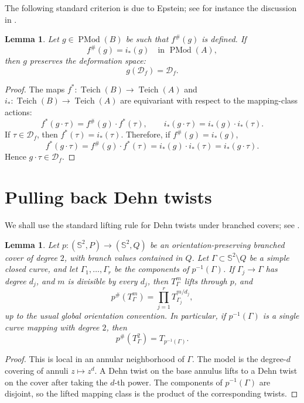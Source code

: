 \documentclass[11pt]{article}
\newtheorem{lemma}[theorem]{Lemma}
\newcommand{\Sph}{\mathbb S^2}
\newcommand{\Teich}{\operatorname{Teich}}
\newcommand{\D}{\mathcal D}
\newcommand{\PMod}{\operatorname{PMod}}
\begin{document}
The following standard criterion is due to Epstein; see for instance the discussion in \cite{discDef, defspaces}.

\begin{lemma}\label{lem:preserve}
Let $g\in \PMod(B)$ be such that $f^{\#}(g)$ is defined.  If
\[
  f^{\#}(g)=i_*(g)\quad\text{in }\PMod(A),
\]
then $g$ preserves the deformation space:
\[
  g(\D_f)=\D_f.
\]
\end{lemma}

\begin{proof}
The maps $f^*:\Teich(B)\to\Teich(A)$ and $i_*:\Teich(B)\to\Teich(A)$ are equivariant with respect to the mapping-class actions:
\[
  f^*(g\cdot \tau)=f^{\#}(g)\cdot f^*(\tau),
  \qquad
  i_*(g\cdot \tau)=i_*(g)\cdot i_*(\tau).
\]
If $\tau\in\D_f$, then $f^*(\tau)=i_*(\tau)$.  Therefore, if $f^{\#}(g)=i_*(g)$,
\[
  f^*(g\cdot\tau)
  =f^{\#}(g)\cdot f^*(\tau)
  =i_*(g)\cdot i_*(\tau)
  =i_*(g\cdot\tau).
\]
Hence $g\cdot\tau\in\D_f$.
\end{proof}

\section{Pulling back Dehn twists}

We shall use the standard lifting rule for Dehn twists under branched covers; see \cite{defspaces}.

\begin{lemma}\label{lem:twistlift}
Let $p:(\Sph,P)\to(\Sph,Q)$ be an orientation-preserving branched cover of degree $2$, with branch values contained in $Q$.  Let $\Gamma\subset\Sph\setminus Q$ be a simple closed curve, and let $\Gamma_1,\dots,\Gamma_r$ be the components of $p^{-1}(\Gamma)$.  If $\Gamma_j\to\Gamma$ has degree $d_j$, and $m$ is divisible by every $d_j$, then $T_\Gamma^m$ lifts through $p$, and
\[
  p^{\#}(T_\Gamma^m)=\prod_{j=1}^r T_{\Gamma_j}^{m/d_j},
\]
up to the usual global orientation convention.  In particular, if $p^{-1}(\Gamma)$ is a single curve mapping with degree $2$, then
\[
  p^{\#}(T_\Gamma^2)=T_{p^{-1}(\Gamma)}.
\]
\end{lemma}

\begin{proof}
This is local in an annular neighborhood of $\Gamma$.  The model is the degree-$d$ covering of annuli $z\mapsto z^d$.  A Dehn twist on the base annulus lifts to a Dehn twist on the cover after taking the $d$-th power.  The components of $p^{-1}(\Gamma)$ are disjoint, so the lifted mapping class is the product of the corresponding twists.
\end{proof}
\end{document}
